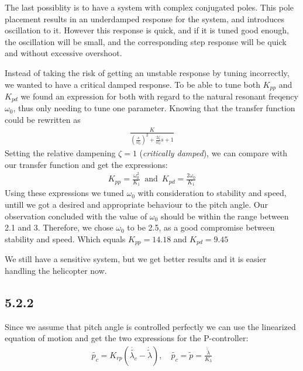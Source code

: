 The last possiblity is to have a system with complex conjugated poles. This pole placement results in an underdamped response for the system, and introduces oscillation to it. However this response is quick, and if it is tuned good enough, the oscillation will be small, and the corresponding step response will be quick and without excessive overshoot.

Instead of taking the risk of getting an unstable response by tuning incorrectly, we wanted to have a critical damped response. To be able to tune both $K_{pp}$ and $K_{pd}$ we found an expression for both with regard to the natural resonant freqency $\omega_0$, thus only needing to tune one parameter. Knowing that the transfer function could be rewritten as 
\begin{align*}
    \frac{K}{(\frac{s}{\omega_0})^2+\frac{2\zeta}{\omega_0}s +1}
\end{align*} 
Setting the relative dampening $\zeta = 1$ (\textit{critically damped}), we can compare with our transfer function and get the expressions:
\begin{align*}
    K_{pp} = \frac{\omega_0^2}{K_1}\enspace \text{and}\enspace K_{pd} = \frac{2\omega_0}{K_1}
\end{align*}
Using these expressions we tuned $\omega_0$ with consideration to stability and speed, untill we got a desired and appropriate behaviour to the pitch angle. Our observation concluded with the value of $\omega_0$ should be within the range between 2.1 and 3. Therefore, we chose $\omega_0$ to be 2.5, as a good compromise between stability and speed. Which equals $K_{pp} = 14.18$ and $K_{pd} = 9.45$

We still have a sensitive system, but we get better results and it is easier handling the helicopter now. 


\newpage
{}
\subsection*{5.2.2}
Since we assume that pitch angle is controlled perfectly we can use the linearized equation of motion and get the two expressions for the P-controller:
\begin{align*}
    \tilde{p_c} = K_{rp}(\dot{\tilde{\lambda_c}} - \dot{\tilde{\lambda}}),\quad \tilde{p_c} = \tilde{p} = \frac{\ddot{\tilde{\lambda}}}{K_3}
\end{align*}

